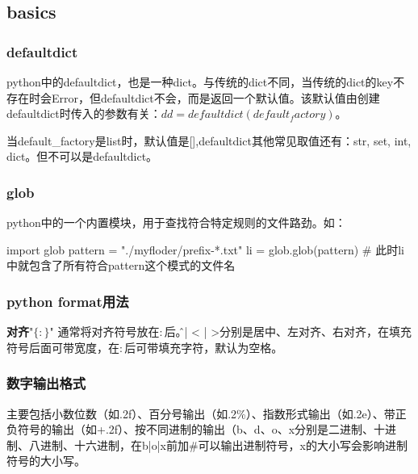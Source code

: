 \subsection{basics}
\subsubsection{defaultdict} python中的defaultdict，也是一种dict。与传统的dict不同，当传统的dict的key不存在时会Error，但defaultdict不会，而是返回一个默认值。该默认值由创建defaultdict时传入的参数有关：$dd = defaultdict(default_factory)$。

当default\_factory是list时，默认值是[],defaultdict其他常见取值还有：str, set, int, dict。但不可以是defaultdict。

\subsubsection{glob} python中的一个内置模块，用于查找符合特定规则的文件路劲。如：
\begin{python}
	import glob
	pattern = "./myfloder/prefix-*.txt"
	li = glob.glob(pattern) # 此时li中就包含了所有符合pattern这个模式的文件名
\end{python}

\subsubsection{python format用法}
\textbf{对齐}"$\{:\}$" 通常将对齐符号放在$:$后。\^ 、| < | >分别是居中、左对齐、右对齐，在填充符号后面可带宽度，在$:$后可带填充字符，默认为空格。

\subsubsection{数字输出格式}主要包括小数位数（如.2f）、百分号输出（如.2\%）、指数形式输出（如.2e）、带正负符号的输出（如+.2f）、按不同进制的输出（b、d、o、x分别是二进制、十进制、八进制、十六进制，在b|o|x前加\#可以输出进制符号，x的大小写会影响进制符号的大小写。


